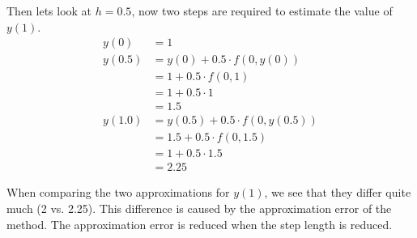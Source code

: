 Then lets look at $h = 0.5$, now two steps are required to 
estimate the value of $y(1)$.
\begin{align*}
y(0) & = 1 \\
y(0.5) & = y(0) + 0.5 \cdot f(0, y(0)) \\
& = 1 + 0.5 \cdot f(0, 1) \\
& = 1 + 0.5 \cdot 1 \\
& = 1.5 \\
y(1.0) & = y(0.5) + 0.5 \cdot f(0, y(0.5)) \\
& = 1.5 + 0.5 \cdot f(0, 1.5) \\
& = 1 + 0.5 \cdot 1.5 \\
& = 2.25
\end{align*}

When comparing the two approximations for $y(1)$, 
we see that they differ quite much (2 vs. 2.25).
This difference is caused by the approximation error of the method.
The approximation error is reduced when the step length is reduced.



